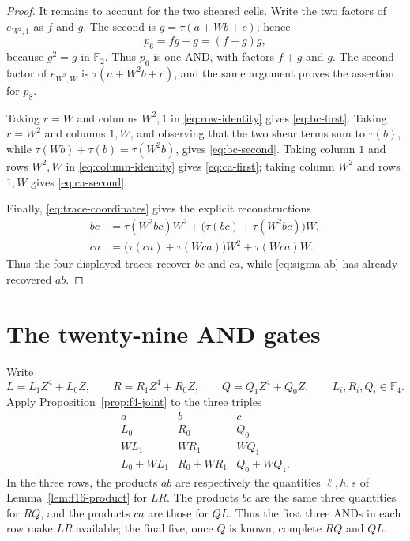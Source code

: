 \documentclass[11pt]{article}
\newcommand{\F}{\mathbb F}
\begin{document}
\begin{proof}
It remains to account for the two sheared cells.  Write the two factors of
\(e_{W^2,1}\) as \(f\) and \(g\).  The second is
\(g=\tau(a+Wb+c)\); hence
\[
 p_6=fg+g=(f+g)g,
\]
because \(g^2=g\) in \(\F_2\).  Thus \(p_6\) is one AND, with factors
\(f+g\) and \(g\).  The second factor of \(e_{W^2,W}\) is
\(\tau(a+W^2b+c)\), and the same argument proves the assertion for
\(p_8\).

Taking \(r=W\) and columns \(W^2,1\) in
\eqref{eq:row-identity} gives \eqref{eq:bc-first}.  Taking \(r=W^2\)
and columns \(1,W\), and observing that the two shear terms sum to
\(\tau(b)\), while
\(\tau(Wb)+\tau(b)=\tau(W^2b)\), gives \eqref{eq:bc-second}.  Taking
column \(1\) and rows
\(W^2,W\) in \eqref{eq:column-identity} gives
\eqref{eq:ca-first}; taking column \(W^2\) and rows \(1,W\) gives
\eqref{eq:ca-second}.

Finally, \eqref{eq:trace-coordinates} gives the explicit reconstructions
\[
 \begin{split}
 bc&=\tau(W^2bc)W^2+
       \bigl(\tau(bc)+\tau(W^2bc)\bigr)W,\\
 ca&=\bigl(\tau(ca)+\tau(Wca)\bigr)W^2+\tau(Wca)W.
 \end{split}
\]
Thus the four displayed traces recover \(bc\) and \(ca\), while
\eqref{eq:sigma-ab} has already recovered \(ab\).
\end{proof}

\section{The twenty-nine AND gates}

Write
\[
 L=L_1Z^4+L_0Z,\qquad
 R=R_1Z^4+R_0Z,\qquad
 Q=Q_1Z^4+Q_0Z,\qquad L_i,R_i,Q_i\in\F_4.
\]
Apply Proposition~\ref{prop:f4-joint} to the three triples
\begin{equation}\label{eq:three-rows}
 \begin{array}{ccc}
 a&b&c\\
 \hline
 L_0&R_0&Q_0\\
 WL_1&WR_1&WQ_1\\
 L_0+WL_1&R_0+WR_1&Q_0+WQ_1.
 \end{array}
\end{equation}
In the three rows, the products \(ab\) are respectively the quantities
\(\ell,h,s\) of Lemma~\ref{lem:f16-product} for \(LR\).  The products
\(bc\) are the same three quantities for \(RQ\), and the products
\(ca\) are those for \(QL\).  Thus the first three ANDs in each row
make \(LR\) available; the final five, once \(Q\) is known, complete
\(RQ\) and \(QL\).
\end{document}
